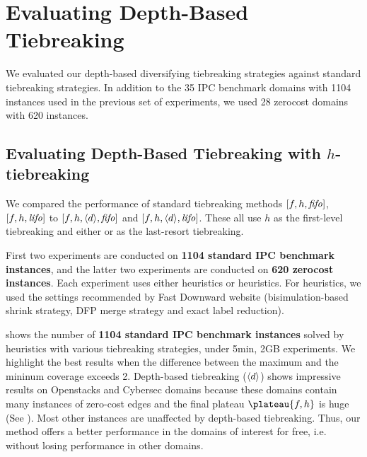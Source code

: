 % 
% 
% 
% 
% 

% 


\section{Evaluating Depth-Based Tiebreaking}
\label{sec:depth-based-evaluation}
We evaluated our depth-based diversifying tiebreaking strategies against standard
tiebreaking strategies.
In addition to the 35 IPC benchmark domains with 1104 instances used in
the previous set of experiments, we used 28 zerocost domains with 620
instances.

\subsection{Evaluating Depth-Based Tiebreaking with $h$-tiebreaking}

We compared the performance of standard tiebreaking methods $[f,h,{\mbox{\textit{fifo}}}]$,
$[f,h,{\mbox{\textit{lifo}}}]$ to $[f,h,{\left<d\right>},{\mbox{\textit{fifo}}}]$ and
$[f,h,{\left<d\right>},{\mbox{\textit{lifo}}}]$.  These all use $h$ as the first-level
tiebreaking and either \fifo or \lifo as the last-resort tiebreaking.

First two experiments are conducted on \textbf{1104 standard IPC
benchmark instances}, and the latter two experiments are conducted on
\textbf{620 zerocost instances}.  Each experiment uses either \lmcut
heuristics or \mands heuristics.  For \mands heuristics, we used the
settings recommended by Fast Downward website (bisimulation-based shrink
strategy, DFP merge strategy and exact label reduction).

 shows the number of \textbf{1104 standard
IPC benchmark instances} solved by \lmcut heuristics with various
tiebreaking strategies, under 5min, 2GB experiments. We highlight the
best results when the difference between the maximum and the mininum
coverage exceeds 2.  Depth-based tiebreaking (${\left<d\right>}$) shows
impressive results on Openstacks and Cybersec domains because these
domains contain many instances of zero-cost edges and the final plateau
$\plateau{f,h}$ is huge (See ).  Most other instances
are unaffected by depth-based tiebreaking.  Thus, our method offers a
better performance in the domains of interest for free, i.e. without
losing performance in other domains.



